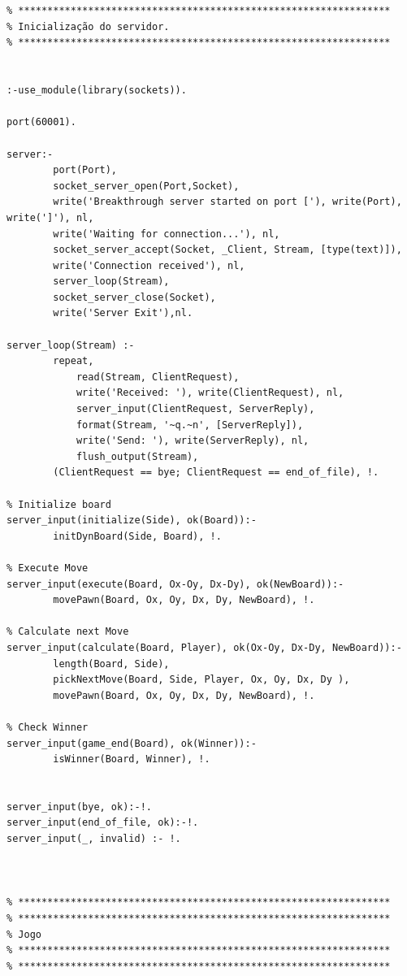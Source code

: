 \documentclass[15pt,a4paper]{article}
\begin{document}

\begin{lstlisting}


% ****************************************************************
% Inicialização do servidor.
% ****************************************************************


:-use_module(library(sockets)).

port(60001).

server:-
		port(Port),
		socket_server_open(Port,Socket),
		write('Breakthrough server started on port ['), write(Port), write(']'), nl,
		write('Waiting for connection...'), nl,
		socket_server_accept(Socket, _Client, Stream, [type(text)]),
		write('Connection received'), nl,
		server_loop(Stream),
		socket_server_close(Socket),
		write('Server Exit'),nl.

server_loop(Stream) :-
		repeat,
			read(Stream, ClientRequest),
			write('Received: '), write(ClientRequest), nl, 
			server_input(ClientRequest, ServerReply),
			format(Stream, '~q.~n', [ServerReply]),
			write('Send: '), write(ServerReply), nl, 
			flush_output(Stream),
		(ClientRequest == bye; ClientRequest == end_of_file), !.

% Initialize board
server_input(initialize(Side), ok(Board)):- 
		initDynBoard(Side, Board), !.

% Execute Move	
server_input(execute(Board, Ox-Oy, Dx-Dy), ok(NewBoard)):- 
		movePawn(Board, Ox, Oy, Dx, Dy, NewBoard), !.

% Calculate next Move
server_input(calculate(Board, Player), ok(Ox-Oy, Dx-Dy, NewBoard)):- 
		length(Board, Side),
		pickNextMove(Board, Side, Player, Ox, Oy, Dx, Dy ),
		movePawn(Board, Ox, Oy, Dx, Dy, NewBoard), !.
	
% Check Winner
server_input(game_end(Board), ok(Winner)):- 
		isWinner(Board, Winner), !.
	
	
server_input(bye, ok):-!.
server_input(end_of_file, ok):-!.
server_input(_, invalid) :- !.



% ****************************************************************
% ****************************************************************
% Jogo
% ****************************************************************
% ****************************************************************


\end{lstlisting}
\end{document}

